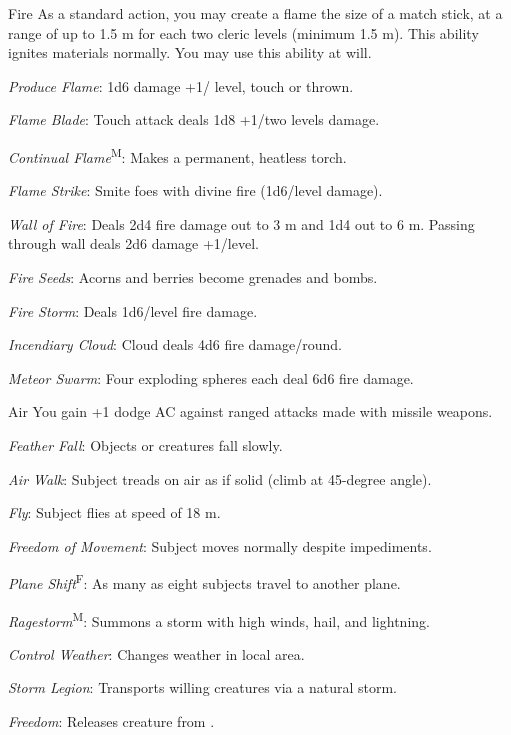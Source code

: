 {Fire}
{As a standard action, you may create a flame the size of a match stick, at a range of up to 1.5 m for each two cleric levels (minimum 1.5 m). This ability ignites materials normally. You may use this ability at will.}
{
	\item \textit{Produce Flame}: 1d6 damage +1/ level, touch or thrown.
	\item \textit{Flame Blade}: Touch attack deals 1d8 +1/two levels damage.
	\item \textit{Continual Flame}\textsuperscript{M}: Makes a permanent, heatless torch.
	\item \textit{Flame Strike}: Smite foes with divine fire (1d6/level damage).
	\item \textit{Wall of Fire}: Deals 2d4 fire damage out to 3 m and 1d4 out to 6 m. Passing through wall deals 2d6 damage +1/level.
	\item \textit{Fire Seeds}: Acorns and berries become grenades and bombs.
	\item \textit{Fire Storm}: Deals 1d6/level fire damage.
	\item \textit{Incendiary Cloud}: Cloud deals 4d6 fire damage/round.
	\item \textit{Meteor Swarm}: Four exploding spheres each deal 6d6 fire damage.
}

{Air}
{You gain +1 dodge AC against ranged attacks made with missile weapons.}
{
	\item \textit{Feather Fall}: Objects or creatures fall slowly.
	\item \textit{Air Walk}: Subject treads on air as if solid (climb at 45-degree angle).
	\item \textit{Fly}: Subject flies at speed of 18 m.
	\item \textit{Freedom of Movement}: Subject moves normally despite impediments.
	\item \textit{Plane Shift}\textsuperscript{F}: As many as eight subjects travel to another plane.
	\item \textit{Ragestorm}\textsuperscript{M}: Summons a storm with high winds, hail, and lightning.
	\item \textit{Control Weather}: Changes weather in local area.
	\item \textit{Storm Legion}: Transports willing creatures via a natural storm.
	\item \textit{Freedom}: Releases creature from .
}

